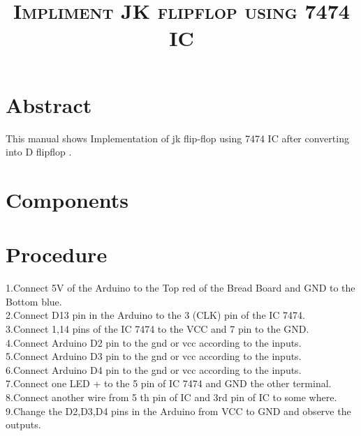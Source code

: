 \documentclass[jornal,10pt,twocolumn]{article}
\title{\textbf{\textsc{Impliment JK flipflop using 7474 IC }}}
\author{\textit{\teflipflopxtbf{Bana Prathyusha}}}
\begin{document}
\section{Abstract}
This manual shows Implementation of jk flip-flop using 7474 IC after converting into D flipflop .
\section{Components}
\begin{table}[ht]
\caption{}
\label{Tabel-1}
\end{table}
\section{Procedure}
1.Connect 5V  of the Arduino to the Top red of the Bread Board  and GND to the Bottom blue.
\\
2.Connect D13 pin in the Arduino to the 3 (CLK) pin of the IC 7474.
\\
3.Connect 1,14  pins of the IC 7474 to the VCC and 7 pin to the GND.
\\
4.Connect  Arduino D2 pin to the gnd or vcc according to the inputs.
\\
5.Connect Arduino D3 pin to the gnd or vcc according to the inputs.
\\
6.Connect Arduino D4 pin to the gnd or vcc according to the inputs.
\\
7.Connect one LED + to the 5 pin of IC 7474 and GND the other terminal.
\\
8.Connect another wire from 5 th pin of IC and 3rd pin of IC to some where.\\
9.Change the D2,D3,D4 pins in the Arduino  from VCC to GND and observe the outputs.
\\
\end{document}

